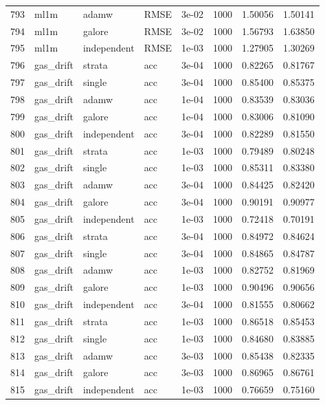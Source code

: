\begin{longtable}{rlllrrrr}
793 & ml1m & adamw & RMSE & 3e-02 & 1000 & 1.50056 & 1.50141 \\
794 & ml1m & galore & RMSE & 3e-02 & 1000 & 1.56793 & 1.63850 \\
795 & ml1m & independent & RMSE & 1e-03 & 1000 & 1.27905 & 1.30269 \\
\rowcolor{oursbg}
796 & gas\_drift & strata & acc & 3e-04 & 1000 & 0.82265 & 0.81767 \\
797 & gas\_drift & single & acc & 3e-04 & 1000 & 0.85400 & 0.85375 \\
798 & gas\_drift & adamw & acc & 1e-04 & 1000 & 0.83539 & 0.83036 \\
799 & gas\_drift & galore & acc & 1e-04 & 1000 & 0.83006 & 0.81090 \\
800 & gas\_drift & independent & acc & 3e-04 & 1000 & 0.82289 & 0.81550 \\
\rowcolor{oursbg}
801 & gas\_drift & strata & acc & 1e-03 & 1000 & 0.79489 & 0.80248 \\
802 & gas\_drift & single & acc & 1e-03 & 1000 & 0.85311 & 0.83380 \\
803 & gas\_drift & adamw & acc & 3e-04 & 1000 & 0.84425 & 0.82420 \\
804 & gas\_drift & galore & acc & 3e-04 & 1000 & 0.90191 & 0.90977 \\
805 & gas\_drift & independent & acc & 1e-03 & 1000 & 0.72418 & 0.70191 \\
\rowcolor{oursbg}
806 & gas\_drift & strata & acc & 3e-04 & 1000 & 0.84972 & 0.84624 \\
807 & gas\_drift & single & acc & 3e-04 & 1000 & 0.84865 & 0.84787 \\
808 & gas\_drift & adamw & acc & 1e-03 & 1000 & 0.82752 & 0.81969 \\
809 & gas\_drift & galore & acc & 1e-03 & 1000 & 0.90496 & 0.90656 \\
810 & gas\_drift & independent & acc & 3e-04 & 1000 & 0.81555 & 0.80662 \\
\rowcolor{oursbg}
811 & gas\_drift & strata & acc & 1e-03 & 1000 & 0.86518 & 0.85453 \\
812 & gas\_drift & single & acc & 1e-03 & 1000 & 0.84680 & 0.83885 \\
813 & gas\_drift & adamw & acc & 3e-03 & 1000 & 0.85438 & 0.82335 \\
814 & gas\_drift & galore & acc & 3e-03 & 1000 & 0.86965 & 0.86761 \\
815 & gas\_drift & independent & acc & 1e-03 & 1000 & 0.76659 & 0.75160 \\

\end{longtable}
